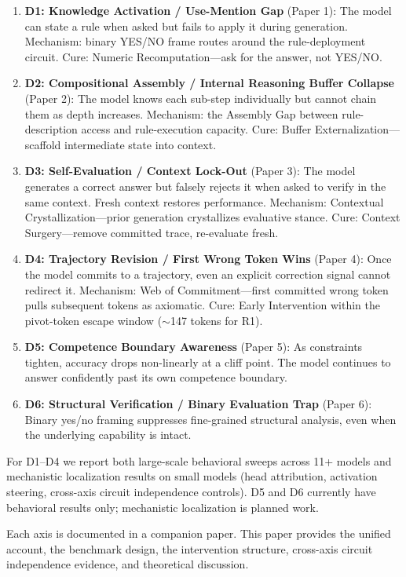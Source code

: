 \documentclass[11pt]{article}
\newcommand{\Umg}{Use-Mention Gap}
\newcommand{\Irb}{Internal Reasoning Buffer}
\newcommand{\Cc}{Contextual Crystallization}
\newcommand{\Bet}{Binary Evaluation Trap}
\begin{document}
\begin{enumerate}[leftmargin=*, noitemsep, topsep=4pt]
\item \textbf{D1: Knowledge Activation / \Umg{}} (Paper 1): The model
can state a rule when asked but fails to apply it during generation.
Mechanism: binary YES/NO frame routes around the rule-deployment circuit.
Cure: Numeric Recomputation---ask for the answer, not YES/NO.
\item \textbf{D2: Compositional Assembly / \Irb{} Collapse} (Paper 2):
The model knows each sub-step individually but cannot chain them as
depth increases.
Mechanism: the Assembly Gap between rule-description access and
rule-execution capacity. Cure: Buffer Externalization---scaffold
intermediate state into context.
\item \textbf{D3: Self-Evaluation / Context Lock-Out} (Paper 3):
The model generates a correct answer but falsely rejects it when asked
to verify in the same context. Fresh context restores performance.
Mechanism: \Cc{}---prior generation crystallizes evaluative stance.
Cure: Context Surgery---remove committed trace, re-evaluate fresh.
\item \textbf{D4: Trajectory Revision / First Wrong Token Wins}
(Paper 4): Once the model commits to a trajectory, even an explicit
correction signal cannot redirect it.
Mechanism: Web of Commitment---first committed wrong token pulls
subsequent tokens as axiomatic.
Cure: Early Intervention within the pivot-token escape window
($\sim$147 tokens for R1).
\item \textbf{D5: Competence Boundary Awareness} (Paper 5): As
constraints tighten, accuracy drops non-linearly at a cliff point. The
model continues to answer confidently past its own competence boundary.
\item \textbf{D6: Structural Verification / \Bet{}} (Paper 6): Binary
yes/no framing suppresses fine-grained structural analysis, even when
the underlying capability is intact.
\end{enumerate}

For D1--D4 we report both large-scale behavioral sweeps across 11+
models and mechanistic localization results on small models (head
attribution, activation steering, cross-axis circuit independence
controls). D5 and D6 currently have behavioral results only; mechanistic
localization is planned work.

Each axis is documented in a companion paper. This paper provides the
unified account, the benchmark design, the intervention structure,
cross-axis circuit independence evidence, and theoretical discussion.
\end{document}
